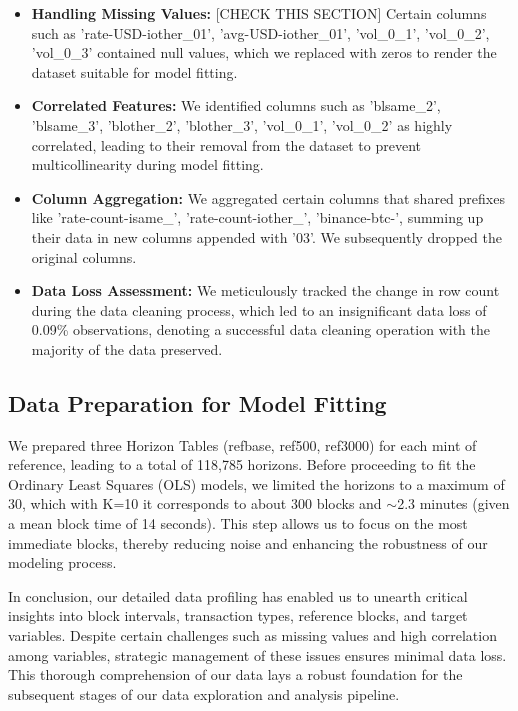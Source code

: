 \documentclass{article}
\begin{document}
\begin{itemize}
    \item \textbf{Handling Missing Values:} [CHECK THIS SECTION] Certain columns such as 'rate-USD-iother\_01', 'avg-USD-iother\_01', 'vol\_0\_1', 'vol\_0\_2', 'vol\_0\_3' contained null values, which we replaced with zeros to render the dataset suitable for model fitting.
    \item \textbf{Correlated Features:} We identified columns such as 'blsame\_2', 'blsame\_3', 'blother\_2', 'blother\_3', 'vol\_0\_1', 'vol\_0\_2' as highly correlated, leading to their removal from the dataset to prevent multicollinearity during model fitting.
    \item \textbf{Column Aggregation:} We aggregated certain columns that shared prefixes like 'rate-count-isame\_', 'rate-count-iother\_', 'binance-btc-', summing up their data in new columns appended with '03'. We subsequently dropped the original columns.
    \item \textbf{Data Loss Assessment:} We meticulously tracked the change in row count during the data cleaning process, which led to an insignificant data loss of 0.09\% observations, denoting a successful data cleaning operation with the majority of the data preserved.
\end{itemize}

\subsection{Data Preparation for Model Fitting}
We prepared three Horizon Tables (refbase, ref500, ref3000) for each mint of reference, leading to a total of 118,785 horizons. Before proceeding to fit the Ordinary Least Squares (OLS) models, we limited the horizons to a maximum of 30, which with K=10 it corresponds to about 300 blocks and $\sim$2.3 minutes (given a mean block time of 14 seconds). This step allows us to focus on the most immediate blocks, thereby reducing noise and enhancing the robustness of our modeling process.

In conclusion, our detailed data profiling has enabled us to unearth critical insights into block intervals, transaction types, reference blocks, and target variables. Despite certain challenges such as missing values and high correlation among variables, strategic management of these issues ensures minimal data loss. This thorough comprehension of our data lays a robust foundation for the subsequent stages of our data exploration and analysis pipeline.
\end{document}
